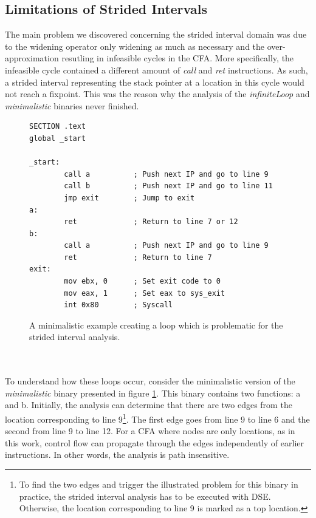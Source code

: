 \documentclass{kththesis}
\renewcommand{\it}[1]{\textit{#1}}
\begin{document}
\subsection{Limitations of Strided Intervals}\label{sec:nonZeroSum}
The main problem we discovered concerning the strided interval domain was due to the widening operator only widening as much as necessary and the over-approximation resutling in infeasible cycles in the CFA. More specifically, the infeasible cycle contained a different amount of \it{call} and \it{ret} instructions. As such, a strided interval representing the stack pointer at a location in this cycle would not reach a fixpoint. This was the reason why the analysis of the \it{infiniteLoop} and \it{minimalistic} binaries never finished.  
\begin{figure}[!t]
    \centering
\begin{tcolorbox}
\begin{verbatim}
SECTION .text
global _start

_start:
        call a          ; Push next IP and go to line 9
        call b          ; Push next IP and go to line 11
        jmp exit        ; Jump to exit
a:            
        ret             ; Return to line 7 or 12
b: 
        call a          ; Push next IP and go to line 9
        ret             ; Return to line 7
exit:
        mov ebx, 0      ; Set exit code to 0
        mov eax, 1      ; Set eax to sys_exit
        int 0x80        ; Syscall
\end{verbatim}
\end{tcolorbox}
\caption{A minimalistic example creating a loop which is problematic for the strided interval analysis.}
    \label{fig:badLoop}
\end{figure}
\noindent
\\ \\
To understand how these loops occur, consider the minimalistic version of the \it{minimalistic} binary presented in figure \ref{fig:badLoop}. This binary contains two functions: a and b. Initially, the analysis can determine that there are two edges from the location corresponding to line 9\footnote{To find the two edges and trigger the illustrated problem for this binary in practice, the strided interval analysis has to be executed with DSE. Otherwise, the location corresponding to line 9 is marked as a top location.}. The first edge goes from line 9 to line 6 and the second from line 9 to line 12. For a CFA where nodes are only locations, as in this work, control flow can propagate through the edges independently of earlier instructions. In other words, the analysis is path insensitive.
\end{document}
